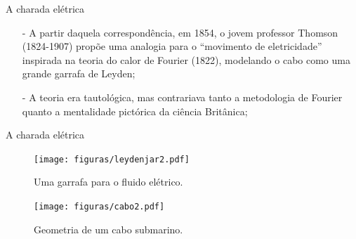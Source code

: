 \documentclass[aspectratio=169]{beamer}
\begin{document}
\begin{frame}{A charada elétrica}
	\begin{itemize}
		\item[-] A partir daquela correspondência, em 1854,\cite{thomson1854} o jovem professor Thomson (1824-1907) propõe uma analogia para o ``movimento de eletricidade'' inspirada na teoria do calor de Fourier (1822),\cite{fourier1822} modelando o cabo como uma grande garrafa de Leyden;
		\item[-] A teoria era tautológica, mas contrariava tanto a metodologia de Fourier quanto a mentalidade pictórica da ciência Britânica;
	\end{itemize}
\end{frame}

\begin{frame}{A charada elétrica}
\begin{minipage}{0.47\textwidth}
\begin{figure}[hbtp]
	\centering
	\texttt{[image: figuras/leydenjar2.pdf]}
	\caption{Uma garrafa para o fluido elétrico.} 
	\label{fig:lydenjar2} 
\end{figure}
\end{minipage}
\begin{minipage}{0.5\textwidth}
\begin{figure}[htbp]
	\centering
	\texttt{[image: figuras/cabo2.pdf]}
	\caption{Geometria de um cabo submarino.} 
	\label{fig:cabo2} 
\end{figure}
\end{minipage}
\end{frame}
\end{document}

